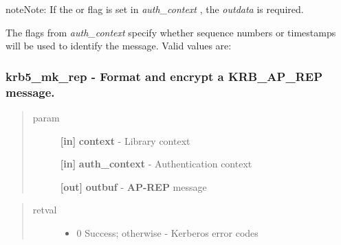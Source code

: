 \documentclass[letterpaper,10pt,english]{sphinxmanual}
\begin{document}
\begin{notice}{note}{Note:}
If the {\hyperref[appdev/refs/macros/KRB5_AUTH_CONTEXT_RET_TIME:KRB5_AUTH_CONTEXT_RET_TIME]{}} or {\hyperref[appdev/refs/macros/KRB5_AUTH_CONTEXT_RET_SEQUENCE:KRB5_AUTH_CONTEXT_RET_SEQUENCE]{}} flag is set in \emph{auth\_context} , the \emph{outdata} is required.

The flags from \emph{auth\_context} specify whether sequence numbers or timestamps will be used to identify the message. Valid values are:
\end{notice}


\subsubsection{krb5\_mk\_rep -  Format and encrypt a KRB\_AP\_REP message.}
\label{appdev/refs/api/krb5_mk_rep:krb5-mk-rep-format-and-encrypt-a-krb-ap-rep-message}\label{appdev/refs/api/krb5_mk_rep::doc}

\begin{fulllineitems}
\label{appdev/refs/api/krb5_mk_rep:krb5_mk_rep}
\end{fulllineitems}

\begin{quote}\begin{description}
\item[{param}] \leavevmode
\textbf{{[}in{]}} \textbf{context} - Library context

\textbf{{[}in{]}} \textbf{auth\_context} - Authentication context

\textbf{{[}out{]}} \textbf{outbuf} - \textbf{AP-REP} message

\end{description}\end{quote}
\begin{quote}\begin{description}
\item[{retval}] \leavevmode\begin{itemize}
\item {} 
0   Success; otherwise - Kerberos error codes

\end{itemize}

\end{description}\end{quote}
\end{document}
